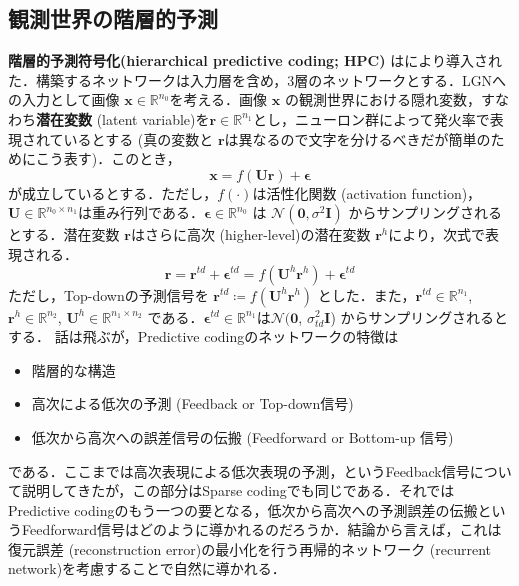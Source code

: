 \subsection{観測世界の階層的予測}
\textbf{階層的予測符号化(hierarchical predictive coding; HPC)} は\citep{Rao1999-zv}により導入された．構築するネットワークは入力層を含め，3層のネットワークとする．LGNへの入力として画像 $\mathbf{x} \in \mathbb{R}^{n_0}$を考える．画像 $\mathbf{x}$ の観測世界における隠れ変数，すなわち\textbf{潜在変数} (latent variable)を$\mathbf{r} \in \mathbb{R}^{n_1}$とし，ニューロン群によって発火率で表現されているとする (真の変数と $\mathbf{r}$は異なるので文字を分けるべきだが簡単のためにこう表す)．このとき，
\begin{equation}
\mathbf{x} = f(\mathbf{U}\mathbf{r}) + \boldsymbol{\epsilon}
\end{equation}
が成立しているとする．ただし，$f(\cdot)$は活性化関数 (activation function)，$\mathbf{U} \in \mathbb{R}^{n_0 \times n_1}$は重み行列である．$\boldsymbol{\epsilon} \in \mathbb{R}^{n_0}$ は $\mathcal{N}(\mathbf{0}, \sigma^2 \mathbf{I})$ からサンプリングされるとする．潜在変数 $\mathbf{r}$はさらに高次 (higher-level)の潜在変数 $\mathbf{r}^h$により，次式で表現される．
\begin{equation}
\mathbf{r} = \mathbf{r}^{td}+\boldsymbol{\epsilon}^{td}=f(\mathbf{U}^h \mathbf{r}^h)+\boldsymbol{\epsilon}^{td}
\end{equation}
ただし，Top-downの予測信号を $\mathbf{r}^{td}\coloneqq f(\mathbf{U}^h \mathbf{r}^h)$ とした．また，$\mathbf{r}^{td} \in \mathbb{R}^{n_1}$, $\mathbf{r}^{h} \in \mathbb{R}^{n_2}$, $\mathbf{U}^h \in \mathbb{R}^{n_1 \times n_2}$ である．$\boldsymbol{\epsilon}^{td} \in \mathbb{R}^{n_1}$は$\mathcal{N}(\mathbf{0}$, $\sigma_{td}^2 \mathbf{I}$) からサンプリングされるとする．
話は飛ぶが，Predictive codingのネットワークの特徴は
\begin{itemize}
\item 階層的な構造
\item 高次による低次の予測 (Feedback or Top-down信号)
\item 低次から高次への誤差信号の伝搬 (Feedforward or Bottom-up 信号)
\end{itemize}
である．ここまでは高次表現による低次表現の予測，というFeedback信号について説明してきたが，この部分はSparse codingでも同じである．それではPredictive codingのもう一つの要となる，低次から高次への予測誤差の伝搬というFeedforward信号はどのように導かれるのだろうか．結論から言えば，これは復元誤差 (reconstruction error)の最小化を行う再帰的ネットワーク (recurrent network)を考慮することで自然に導かれる．
